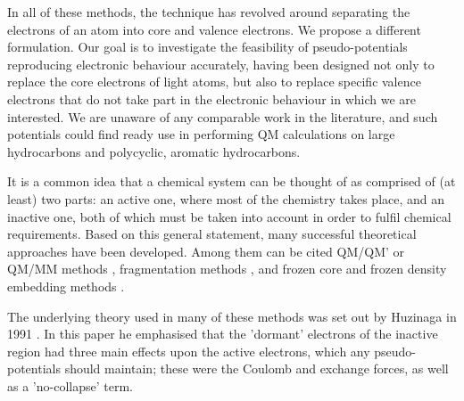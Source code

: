 \documentclass[12pt]{article}
\begin{document}
In all of these methods, the technique has revolved around separating the electrons of an atom into core and valence electrons. We propose a different formulation. Our goal is to investigate the feasibility of pseudo-potentials reproducing electronic behaviour accurately, having been designed not only to replace the core electrons of light atoms, but also to replace specific valence electrons that do not take part in the electronic behaviour in which we are interested. We are unaware of any comparable work in the literature, and such potentials could find ready use in performing QM calculations on large hydrocarbons and polycyclic, aromatic hydrocarbons.

It is a common idea that a chemical system can be thought of as comprised of (at least) 
two parts:
an active one, where most of the chemistry takes place, and an inactive one, both of which must be taken into account in order to fulfil chemical requirements.
Based on this general statement, many successful theoretical approaches have been developed. Among them can be cited QM/QM' or QM/MM methods \cite{chung_oniom_2015,
ihrig_specific_2011,
zhang_pseudobond_1998,
dilabio_simple_2002,
dilabio_efficient_2005,
gao_generalized_1998,
assfeld_quantum_1996,
jacob_calculation_2006,
von_lilienfeld_variational_2004,
von_lilienfeld_performance_2005,
von_lilienfeld_optimization_2004,
goedecker_separable_1996,
hartwigsen_relativistic_1998,
singh_combined_1986,
zhang_pseudobond_1998-1,
zhang_improved_2004,
parks_pseudobond_2008,
dilabio_simple_2002-1,
hitzenberger_optimizing_2016,
hitzenberger_probing_2015,
collins_energy-based_2015,
pezeshki_recent_2015,
von_lilienfeld_force_2013}, 
fragmentation methods 
\cite{gordon_effective_2001,
steinmann_effective_2012}, and frozen core and frozen density embedding methods \cite{ASSFELD1996100, wesolowski_frozen-density_2015}.

 The underlying theory used in many of these methods was set out by Huzinaga in 1991 \cite{huzinaga_effective_1991}. In this paper he emphasised that the 'dormant' electrons of the inactive region had three main effects upon the active electrons, which any pseudo-potentials should maintain; these were the Coulomb and exchange forces, as well as a 'no-collapse' term.
\end{document}
